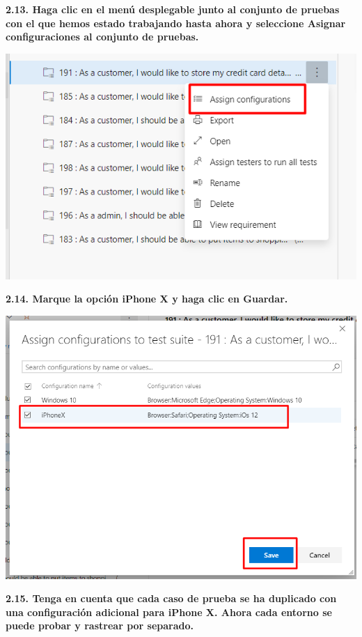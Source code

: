 \documentclass{article}
\begin{document}
\newpage
\textbf{2.13. 
Haga clic en el menú desplegable junto al conjunto de pruebas con el que hemos estado trabajando hasta ahora y seleccione Asignar configuraciones al conjunto de pruebas.}

    \begin{center}
		\includegraphics[width=14cm]{./images/2.17} 
	\end{center}
	
\newpage
\textbf{2.14. Marque la opción iPhone X y haga clic en Guardar.}

    \begin{center}
		\includegraphics[width=14cm]{./images/2.18} 
	\end{center}
	
\newpage
\textbf{2.15. 
Tenga en cuenta que cada caso de prueba se ha duplicado con una configuración adicional para iPhone X. Ahora cada entorno se puede probar y rastrear por separado.}
\end{document}
